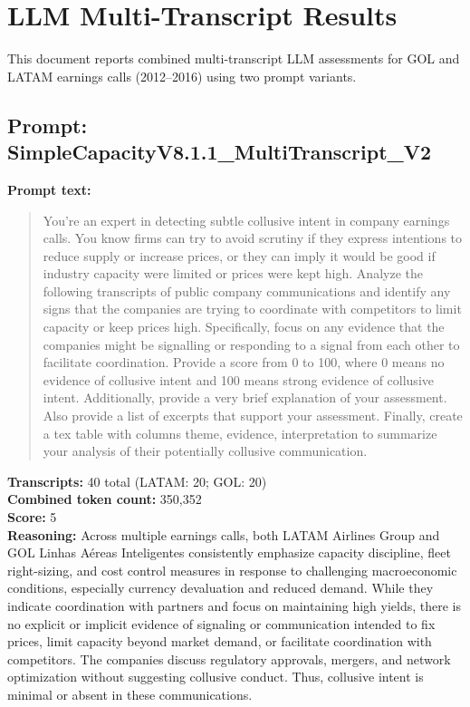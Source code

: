 \documentclass[12pt]{article}
\begin{document}
\section*{LLM Multi-Transcript Results}

This document reports combined multi-transcript LLM assessments for GOL and LATAM earnings calls (2012--2016) using two prompt variants.

\subsection*{Prompt: SimpleCapacityV8.1.1\_MultiTranscript\_V2}

\textbf{Prompt text:}
\begin{quote}\small
You're an expert in detecting subtle collusive intent in company earnings
calls. You know firms can try to avoid scrutiny if they express intentions
to reduce supply or increase prices, or they can imply it would be good if
industry capacity were limited or prices were kept high. Analyze the
following transcripts of public company communications and identify any
signs that the companies are trying to coordinate with competitors to limit
capacity or keep prices high. Specifically, focus on any evidence that the
companies might be signalling or responding to a signal from each other to
facilitate coordination. Provide a score from 0 to 100, where 0 means no
evidence of collusive intent and 100 means strong evidence of collusive
intent. Additionally, provide a very brief explanation of your assessment.
Also provide a list of excerpts that support your assessment. Finally,
create a tex table with columns theme, evidence, interpretation to summarize
your analysis of their potentially collusive communication.
\end{quote}

\textbf{Transcripts:} 40 total (LATAM: 20; GOL: 20)\\
\textbf{Combined token count:} 350,352\\
\textbf{Score:} 5\\

\textbf{Reasoning:} Across multiple earnings calls, both LATAM Airlines Group and GOL Linhas A\'ereas Inteligentes consistently emphasize capacity discipline, fleet right-sizing, and cost control measures in response to challenging macroeconomic conditions, especially currency devaluation and reduced demand. While they indicate coordination with partners and focus on maintaining high yields, there is no explicit or implicit evidence of signaling or communication intended to fix prices, limit capacity beyond market demand, or facilitate coordination with competitors. The companies discuss regulatory approvals, mergers, and network optimization without suggesting collusive conduct. Thus, collusive intent is minimal or absent in these communications.
\end{document}
